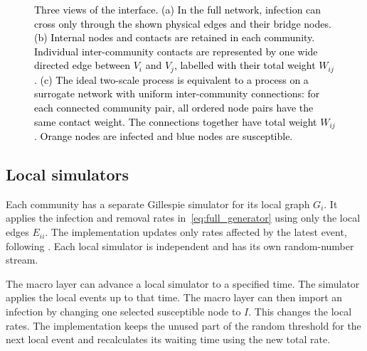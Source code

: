 \documentclass[a4paper,fleqn]{cas-sc}
\begin{document}
\begin{figure}[tbp]
\caption{\textcolor{black}{Three views of the interface. (a) In the full network, infection can cross only through the shown physical edges and their bridge nodes. (b) Internal nodes and contacts are retained in each community. Individual inter-community contacts are represented by one wide directed edge between $V_i$ and $V_j$, labelled with their total weight $W_{ij}$. (c) The ideal two-scale process is equivalent to a process on a surrogate network with uniform inter-community connections: for each connected community pair, all ordered node pairs have the same contact weight. The connections together have total weight $W_{ij}$. Orange nodes are infected and blue nodes are susceptible.}}
\label{fig:schematic}
\end{figure}

\subsection{Local simulators}
\label{sec:local}

Each community has a separate Gillespie simulator for its local graph $G_i$. It applies the infection and removal rates in~\eqref{eq:full_generator} using only the local edges $E_{ii}$. The implementation updates only rates affected by the latest event, following \citet{kuryliak2025simulating}. Each local simulator is independent and has its own random-number stream.

The macro layer can advance a local simulator to a specified time. The simulator applies the local events up to that time. The macro layer can then import an infection by changing one selected susceptible node to $I$. This changes the local rates. The implementation keeps the unused part of the random threshold for the next local event and recalculates its waiting time using the new total rate.
\end{document}
